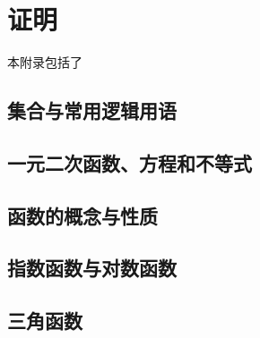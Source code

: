\chapter{证明}
\label{ch:证明}


本附录包括了

\section{集合与常用逻辑用语}

\section{一元二次函数、方程和不等式}

\section{函数的概念与性质}

\section{指数函数与对数函数}

\section{三角函数}